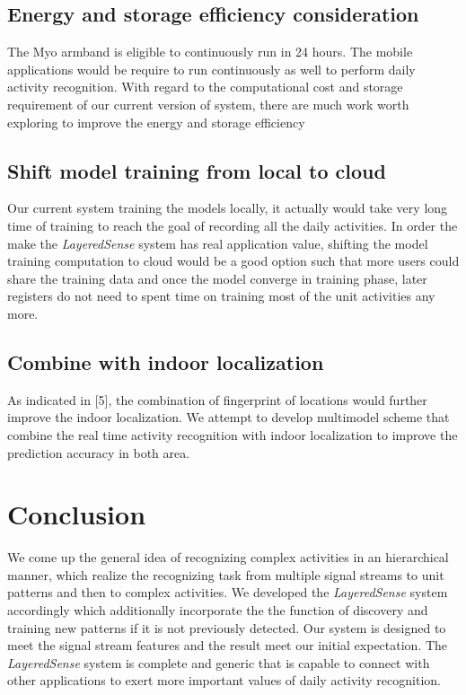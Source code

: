\documentclass[a4paper, 10pt, conference]{IEEEtran}      %
\begin{document}
\subsection{Energy and storage efficiency consideration}
The Myo armband is eligible to continuously run in 24 hours. The mobile applications would be require to run continuously as well to perform daily activity recognition. With regard to the computational cost and storage requirement of our current version of system, there are much work worth exploring to improve the energy and storage efficiency
\subsection{Shift model training from local to cloud }
Our current system training the models locally, it actually would take very long time of training to reach the goal of recording all the daily activities. In order the make the \emph{LayeredSense} system has real application value, shifting the model training computation to cloud would be a good option such that more users could share the training data and once the model converge in training phase, later registers do not need to spent time on training most of the unit activities any more.
\subsection{Combine with indoor localization}
As indicated in [5], the combination of fingerprint of locations would further improve the indoor localization. We attempt to develop multimodel scheme that combine the real time activity recognition with indoor localization to improve the prediction accuracy in both area.

\section{Conclusion}
We come up the general idea of recognizing complex activities in an hierarchical manner, which realize the recognizing task from multiple signal streams to unit patterns and then to complex activities. We developed the \emph{LayeredSense} system accordingly which additionally incorporate the the function of discovery and training new patterns if it is not previously detected. Our system is designed to meet the signal stream features and the result meet our initial expectation. The \emph{LayeredSense} system is complete and generic that is capable to connect with other applications to exert more important values of daily activity recognition.
\end{document}
